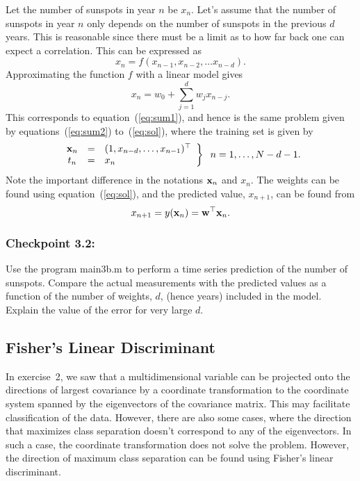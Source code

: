 \documentclass[times,12pt]{article}    %
\def\x{{\bf x}}
\def\w{{\bf w}}
\begin{document}
Let the number of sunspots in year $n$ be $x_n$.  Let's assume that
the number of sunspots in year $n$ only depends on the number of
sunspots in the previous $d$ years. This is reasonable since there
must be a limit as to how far back one can expect a correlation. This
can be expressed as
\begin{equation}
  \label{eq:iterf}
  x_n = f(x_{n-1}, x_{n-2}, \ldots x_{n-d}).
\end{equation}
Approximating the function $f$ with a linear model gives
\begin{equation}
  \label{eq:sun1}
  x_n = w_0 + \sum_{j=1}^d w_j x_{n-j}.
\end{equation}
This corresponds to equation~(\ref{eq:sum1}), and hence is the same
problem given by equations~(\ref{eq:sum2}) to~(\ref{eq:sol}), where
the training set is given by
\begin{equation}
  \label{eq:train}
  \left.
  \begin{array}{ccl}
    \x_n &=& (1, x_{n-d}, \ldots , x_{n-1})^\top\\
    t_n &=& x_n
  \end{array} \right\} \;\; n = 1,\ldots,N-d-1.
\end{equation}
Note the important difference in the notations $\x_n$ and $x_n$.
The weights can be found using equation~(\ref{eq:sol}), and the
predicted value, $x_{n+1}$, can be found from
\begin{equation}
  \label{eq:pred}
  x_{n+1} = y(\x_n) = \w^\top\x_n.
\end{equation}

\subsubsection*{Checkpoint 3.2:}
Use the program {\sf main3b.m} to perform a time series prediction of
the number of sunspots. Compare the actual measurements with the
predicted values as a function of the number of weights, $d$, (hence
years) included in the model. Explain the value of the error for very large $d$.

\subsection*{Fisher's Linear Discriminant}
In exercise~2, we saw that a multidimensional variable can be
projected onto the directions of largest covariance by a coordinate
transformation to the coordinate system spanned by the eigenvectors of
the covariance matrix. This may facilitate classification of the
data. However, there are also some cases, where the direction that
maximizes class separation doesn't correspond to any of the
eigenvectors. In such a case, the coordinate transformation does not
solve the problem. However, the direction of maximum class separation
can be found using Fisher's linear discriminant.
\end{document}

